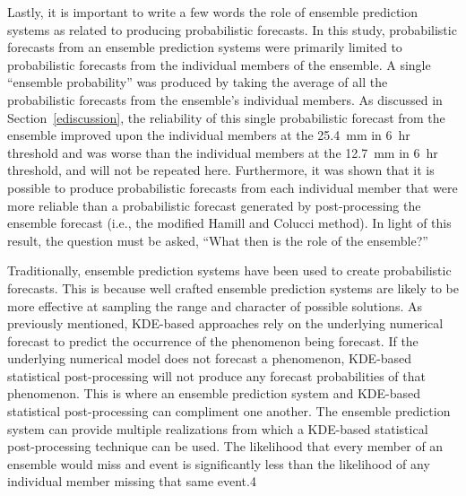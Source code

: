Lastly, it is important to write a few words the role of ensemble prediction systems as related to producing probabilistic forecasts.
In this study, probabilistic forecasts from an ensemble prediction systems were primarily limited to probabilistic forecasts from the individual members of the ensemble.
A single ``ensemble probability'' was produced by taking the average of all the probabilistic forecasts from the ensemble's individual members.
As discussed in \mbox{Section \ref{ediscussion}}, the reliability of this single probabilistic forecast from the ensemble improved upon the individual members at the \mbox{25.4 mm} in \mbox{6 hr} threshold and was worse than the individual members at the \mbox{12.7 mm} in \mbox{6 hr} threshold, and will not be repeated here.
Furthermore, it was shown that it is possible to produce probabilistic forecasts from each individual member that were more reliable than a probabilistic forecast generated by post-processing the ensemble forecast (i.e., the modified Hamill and Colucci method).
In light of this result, the question must be asked, ``What then is the role of the ensemble?''


Traditionally, ensemble prediction systems have been used to create probabilistic forecasts.
This is because well crafted ensemble prediction systems are likely to be more effective at sampling the range and character of possible solutions.
As previously mentioned, KDE-based approaches rely on the underlying numerical forecast to predict the occurrence of the phenomenon being forecast.
If the underlying numerical model does not forecast a phenomenon, KDE-based statistical post-processing will not produce any forecast probabilities of that phenomenon.
This is where an ensemble prediction system and KDE-based statistical post-processing can compliment one another.
The ensemble prediction system can provide multiple realizations from which a KDE-based statistical post-processing technique can be used.
The likelihood that every member of an ensemble would miss and event is significantly less than the likelihood of any individual member missing that same event.4


